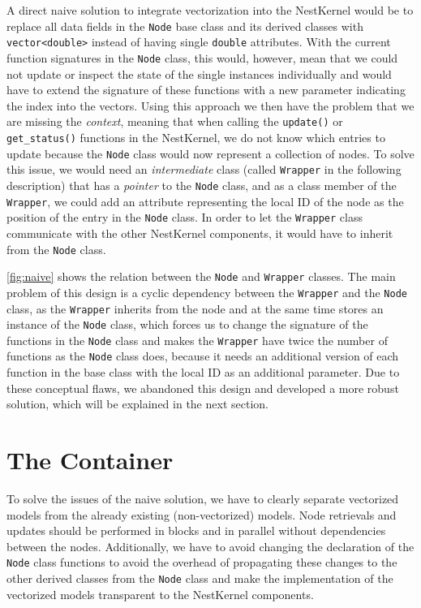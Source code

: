 A direct naive solution to integrate vectorization into the NestKernel would be to replace all data fields in the \texttt{Node} base class and its derived classes with \texttt{vector<double>} instead of having single \texttt{double} attributes. With the current function signatures in the \texttt{Node} class, this would, however, mean that we could not update or inspect the state of the single instances individually and would have to extend the signature of these functions with a new parameter indicating the index into the vectors. Using this approach we then have the problem that we are missing the \emph{context}, meaning that when calling the \texttt{update()} or \texttt{get\_status()} functions in the NestKernel, we do not know which entries to update because the \texttt{Node} class would now represent a collection of nodes. To solve this issue, we would need an \emph{intermediate} class (called \texttt{Wrapper} in the following description) that has a \emph{pointer} to the \texttt{Node} class, and as a class member of the \texttt{Wrapper}, we could add an attribute representing the local ID of the node as the position of the entry in the \texttt{Node} class. In order to let the \texttt{Wrapper} class communicate with the other NestKernel components, it would have to inherit from the \texttt{Node} class.

\autoref{fig:naive} shows the relation between the \texttt{Node} and \texttt{Wrapper} classes. The main problem of this design is a cyclic dependency between the \texttt{Wrapper} and the \texttt{Node} class, as the \texttt{Wrapper} inherits from the node and at the same time stores an instance of the \texttt{Node} class, which forces us to change the signature of the functions in the \texttt{Node} class and makes the \texttt{Wrapper} have twice the number of functions as the \texttt{Node} class does, because it needs an additional version of each function in the base class with the local ID as an additional parameter. Due to these conceptual flaws, we abandoned this design and developed a more robust solution, which will be explained in the next section.

\section{The Container}

To solve the issues of the naive solution, we have to clearly separate vectorized models from the already existing (non-vectorized) models. Node retrievals and updates should be performed in blocks and in parallel without dependencies between the nodes. Additionally, we have to avoid changing the declaration of the \texttt{Node} class functions to avoid the overhead of propagating these changes to the other derived classes from the \texttt{Node} class and make the implementation of the vectorized models transparent to the NestKernel components.

